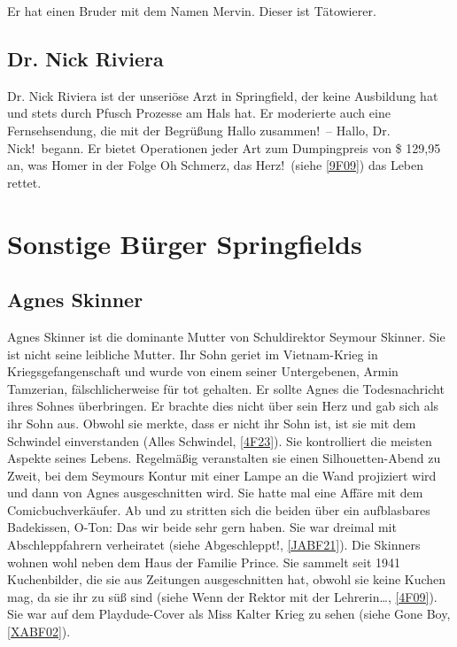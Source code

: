 Er hat einen Bruder mit dem Namen Mervin. Dieser ist Tätowierer.


\subsection{Dr. Nick Riviera}
Dr. Nick Riviera ist der unseriöse Arzt in Springfield, der keine Ausbildung hat und stets durch Pfusch Prozesse am Hals hat. Er moderierte auch eine Fernsehsendung, die mit der Begrüßung \glqq Hallo zusammen!\grqq\ -- \glqq Hallo, Dr. Nick!\grqq\ begann. Er bietet Operationen jeder Art zum Dumpingpreis von \$ 129,95 an, was Homer in der Folge \glqq Oh Schmerz, das Herz!\grqq\ (siehe \ref{9F09}) das Leben rettet.


\section{Sonstige Bürger Springfields}

\subsection{Agnes Skinner}\label{AgnesSkinner}
Agnes Skinner ist die dominante Mutter von Schuldirektor Seymour Skinner. Sie ist nicht seine leibliche Mutter. Ihr Sohn geriet im Vietnam-Krieg in Kriegsgefangenschaft und wurde von einem seiner Untergebenen, Armin Tamzerian, fälschlicherweise für tot gehalten. Er sollte Agnes die Todesnachricht ihres Sohnes überbringen. Er brachte dies nicht über sein Herz und gab sich als ihr Sohn aus. Obwohl sie merkte, dass er nicht ihr Sohn ist, ist sie mit dem Schwindel einverstanden (\glqq Alles Schwindel\grqq , \ref{4F23}). Sie kontrolliert die meisten Aspekte seines Lebens. Regelmäßig veranstalten sie einen Silhouetten-Abend zu Zweit, bei dem Seymours Kontur mit einer Lampe an die Wand projiziert wird und dann von Agnes ausgeschnitten wird. Sie hatte mal eine Affäre mit dem Comicbuchverkäufer. Ab und zu stritten sich die beiden über ein aufblasbares Badekissen, O-Ton: \glqq Das wir beide sehr gern haben\grqq . Sie war dreimal mit Abschleppfahrern verheiratet (siehe \glqq Abgeschleppt!\grqq , \ref{JABF21}). Die Skinners wohnen wohl neben dem Haus der Familie Prince. Sie sammelt seit 1941 Kuchenbilder, die sie aus Zeitungen ausgeschnitten hat, obwohl sie keine Kuchen mag, da sie ihr zu süß sind (siehe \glqq Wenn der Rektor mit der Lehrerin\dots\grqq , \ref{4F09}). Sie war auf dem Playdude-Cover als Miss Kalter Krieg zu sehen (siehe \glqq Gone Boy\grqq, \ref{XABF02}).

